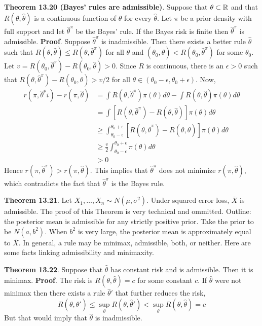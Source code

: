 \textbf{Theorem 13.20 (Bayes' rules are admissible)}. Suppose that
\(\theta \subset \mathbb{R}\) and that \(R(\theta, \hat{\theta})\) is a
continuous function of \(\theta\) for every \(\hat{\theta}\). Let
\(\pi\) be a prior density with full support and let
\(\hat{\theta}^\pi\) be the Bayes' rule. If the Bayes risk is finite
then \(\hat{\theta}^\pi\) is admissible.
\textbf{Proof}. Suppose \(\hat{\theta}^\pi\) is inadmissible. Then there
exists a better rule \(\hat{\theta}\) such that
\(R(\theta, \hat{\theta}) \leq R(\theta, \hat{\theta}^\pi)\) for all
\(\theta\) and
\((\theta_{0}, \hat{\theta}) < R(\theta_{0}, \hat{\theta}^\pi)\) for some
\(\theta_{0}\). Let
\(v = R(\theta_{0}, \hat{\theta}^\pi) - R(\theta_{0}, \hat{\theta}) > 0\).
Since \(R\) is continuous, there is an \(\epsilon > 0\) such that
\(R(\theta, \hat{\theta}^\pi) - R(\theta_{0}, \hat{\theta}) > v/2\) for
all \(\theta \in (\theta_{0} - \epsilon, \theta_{0} + \epsilon)\). Now,
\begin{align*}
r(\pi, \hat{\theta}^pi) - r(\pi, \hat{\theta}) &= \int R(\theta, \hat{\theta}^\pi) \pi(\theta) d\theta - \int R(\theta, \hat{\theta}) \pi(\theta) d\theta \\
&= \int \left[ R(\theta, \hat{\theta}^\pi) - R(\theta, \hat{\theta})\right] \pi(\theta) d\theta \\
&\geq \int_{\theta_{0} - \epsilon}^{\theta_{0} + \epsilon} \left[ R(\theta, \hat{\theta}^\pi) - R(\theta, \hat{\theta})\right] \pi(\theta) d\theta \\
& \geq \frac{v}{2} \int_{\theta_{0} - \epsilon}^{\theta_{0} + \epsilon} \pi(\theta) d\theta \\
& > 0
\end{align*}
Hence \(r(\pi, \hat{\theta}^\pi) > r(\pi, \hat{\theta})\). This implies
that \(\hat{\theta}^\pi\) does not minimize \(r(\pi, \hat{\theta})\),
which contradicts the fact that \(\hat{\theta}^\pi\) is the Bayes rule.

\textbf{Theorem 13.21}. Let \(X_{1}, \dots, X_{n} \sim N(\mu, \sigma^{2})\).
Under squared error loss, \(\bar{X}\) is admissible.
The proof of this Theorem is very technical and ommitted. Outline: the
posterior mean is admissible for any strictly positive prior. Take the
prior to be \(N(a, b^{2})\). When \(b^{2}\) is very large, the posterior
mean is approximately equal to \(\bar{X}\).
In general, a rule may be minimax, admissible, both, or neither. Here
are some facts linking admissibility and minimaxity.

\textbf{Theorem 13.22}. Suppose that \(\hat{\theta}\) has constant risk
and is admissible. Then it is minimax.
\textbf{Proof}. The risk is \(R(\theta, \hat{\theta}) = c\) for some
constant \(c\). If \(\hat{\theta}\) were not minimax then there exists a
rule \(\hat{\theta}'\) that further reduces the risk,
\[
R(\theta, \hat{\theta}') \leq \sup_{\theta} R(\theta, \hat{\theta}') < \sup_{\theta} R(\theta, \hat{\theta}) = c
\]
But that would imply that \(\hat{\theta}\) is inadmissible.

